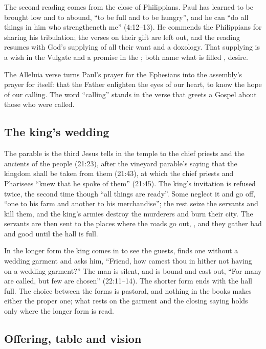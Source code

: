The second reading comes from the close of Philippians. Paul has learned to be brought low and to abound,
``to be full and to be hungry'', and he can ``do all things in him who
strengtheneth me'' (4:12--13). He commends the Philippians for sharing his
tribulation; the verses on their gift are left out, and the reading resumes
with God's supplying of all their want and a doxology. That supplying is a
wish in the Vulgate and a promise in the ; both name what is
filled , desire.

The Alleluia verse turns Paul's prayer for the Ephesians into the assembly's
prayer for itself: that the Father enlighten the eyes of our heart, to know
the hope of our calling. The word ``calling'' stands in the verse that greets
a Gospel about those who were called.

\subsection{The king's wedding}

The parable is the third Jesus tells in the temple to the chief priests and
the ancients of the people (21:23), after the vineyard parable's saying that
the kingdom shall be taken from them (21:43), at which the chief priests and
Pharisees ``knew that he spoke of them'' (21:45). The king's invitation is
refused twice, the second time
though ``all things are ready''. Some neglect it and go off, ``one to his farm
and another to his merchandise''; the rest seize the servants and kill them,
and the king's armies destroy the murderers and burn their city. The servants
are then sent to the places where the roads go out, ,
and they gather bad and good until the hall is full.

In the longer form the king comes in to see the guests, finds one without a
wedding garment and asks him, ``Friend, how camest thou in hither not having
on a wedding garment?'' The man
is silent, and is bound and cast out, ``For many are called, but few are
chosen'' (22:11--14). The shorter form ends with the hall full. The choice
between the forms is pastoral, and nothing in the books makes either the
proper one; what rests on the garment and the closing saying holds only where
the longer form is read.

\subsection{Offering, table and vision}

